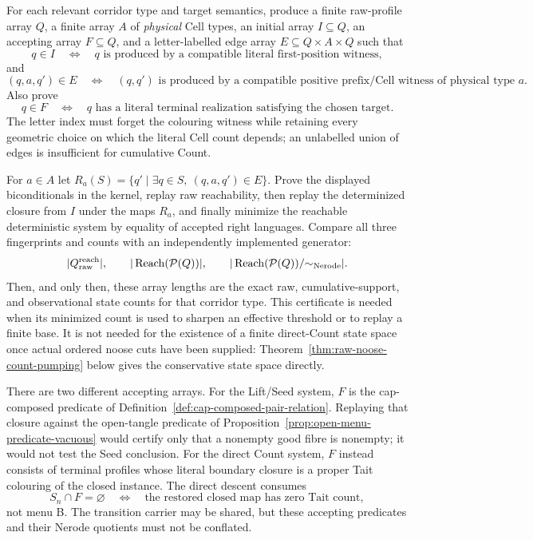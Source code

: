\begin{proposition}
\label{prop:exact-closure-gate}
\Sopen
For each relevant corridor type and target semantics, produce a finite
raw-profile array $Q$, a finite array $A$ of \emph{physical} Cell types, an
initial array $I\subseteq Q$, an accepting array $F\subseteq Q$, and a
letter-labelled edge array
$E\subseteq Q\times A\times Q$ such that
\[
 q\in I\quad\Longleftrightarrow\quad
 q\text{ is produced by a compatible literal first-position witness},
\]
and
\[
 (q,a,q')\in E\quad\Longleftrightarrow\quad
 (q,q')\text{ is produced by a compatible positive prefix/Cell witness
 of physical type }a.
\]
Also prove
\[
 q\in F\quad\Longleftrightarrow\quad
 q\text{ has a literal terminal realization satisfying the chosen target.}
\]
The letter index must forget the colouring witness while retaining every
geometric choice on which the literal Cell count depends; an unlabelled union
of edges is insufficient for cumulative Count.

For $a\in A$ let
$R_a(S)=\{q'\mid\exists q\in S,\ (q,a,q')\in E\}$.
Prove the displayed biconditionals in the kernel, replay raw reachability,
then replay the determinized closure from $I$ under the maps $R_a$, and
finally minimize the reachable deterministic system by equality of accepted
right languages.  Compare all three fingerprints and counts with an
independently implemented generator:
\[
 |Q_{\rm raw}^{\rm reach}|,\qquad
 |\operatorname{Reach}(\mathcal P(Q))|,\qquad
 |\operatorname{Reach}(\mathcal P(Q))/\mathord{\sim}_{\rm Nerode}|.
\]
Then, and only then, these array lengths are the exact raw, cumulative-support,
and observational state counts for that corridor type.  This certificate is
needed when its minimized count is used to sharpen an effective threshold or
to replay a finite base.  It is not needed for the existence of a finite
direct-Count state space once actual ordered noose cuts have been supplied:
Theorem~\ref{thm:raw-noose-count-pumping} below gives the conservative state
space directly.
\end{proposition}

There are two different accepting arrays.  For the Lift/Seed system, $F$ is
the cap-composed predicate of
Definition~\ref{def:cap-composed-pair-relation}.  Replaying that closure
against the open-tangle predicate of
Proposition~\ref{prop:open-menu-predicate-vacuous} would certify only that a
nonempty good fibre is nonempty; it would not test the Seed conclusion.  For
the direct Count system, $F$ instead consists of terminal profiles whose
literal boundary closure is a proper Tait colouring of the closed instance.
The direct descent consumes
\[
  S_n\cap F=\varnothing
  \quad\Longleftrightarrow\quad
  \text{the restored closed map has zero Tait count},
\]
not menu B.  The transition carrier may be shared, but these accepting
predicates and their Nerode quotients must not be conflated.

